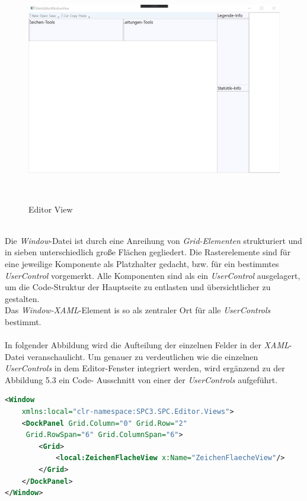 \begin{figure}[hbt!]
    \centering
    \includegraphics[width=15cm,height=10cm,keepaspectratio]{5Implementierungen/Bilder/EditorView.JPG}
    \caption{Editor View}
\end{figure}
\\Die \textit{Window}-Datei ist durch eine Anreihung von \textit{Grid-Elementen} strukturiert und in sieben unterschiedlich große Flächen gegliedert. Die 
Rasterelemente sind für eine jeweilige Komponente als Platzhalter gedacht, bzw. für ein bestimmtes \textit{UserControl} vorgemerkt. Alle Komponenten 
sind als ein \textit{UserControl} ausgelagert, um die Code-Struktur der Hauptseite zu entlasten und übersichtlicher zu gestalten.
\\Das \textit{Window-XAML}-Element is so als zentraler Ort für alle \textit{UserControls} bestimmt.
\\
\pagebreak
\\In folgender Abbildung wird die Aufteilung der einzelnen Felder in der \textit{XAML}-Datei veranschaulicht.
Um genauer zu verdeutlichen wie die einzelnen \textit{UserControls} in dem Editor-Fenster integriert werden, wird ergänzend zu der Abbildung 5.3 ein Code-
Ausschnitt von einer der \textit{UserControls} aufgeführt.
\\
\begin{lstlisting}[language=XML,
    frame=single,           % Ein Rahmen um den Code
    framexleftmargin=15pt,  % Rahmen link von den Zahlen
    style=algoBericht,
    label={usercontrolsnippet},
    captionpos=b,           % Caption unter den Code setzen
caption={UserControl-Referenz Code-Auschnitt}]
<Window
    xmlns:local="clr-namespace:SPC3.SPC.Editor.Views">
    <DockPanel Grid.Column="0" Grid.Row="2" 
     Grid.RowSpan="6" Grid.ColumnSpan="6">
        <Grid>
            <local:ZeichenFlacheView x:Name="ZeichenFlaecheView"/>
        </Grid>
    </DockPanel>
</Window>
\end{lstlisting}
